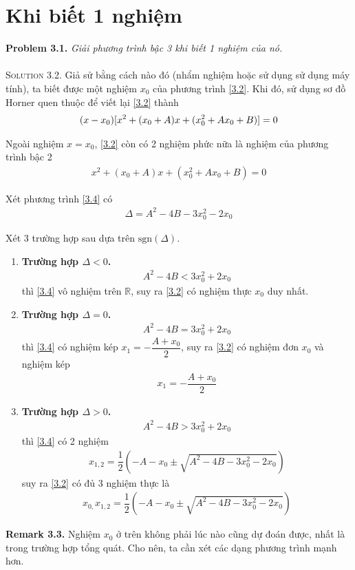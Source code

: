 \documentclass[a4paper,oneside]{book}
\numberwithin{equation}{chapter}
\begin{document}
\section{Khi biết 1 nghiệm}
\textbf{Problem 3.1.} \textit{Giải phương trình bậc 3 khi biết 1 nghiệm của nó.}\\
\\
\textsc{Solution 3.2.} Giả sử bằng cách nào đó (nhẩm nghiệm hoặc sử dụng sử dụng máy tính), ta biết được một nghiệm ${x_0}$ của phương trình \eqref{3.2}. Khi đó, sử dụng sơ đồ Horner quen thuộc để viết lại \eqref{3.2} thành
\begin{align}
(x - {x_0}){\rm{[}}{x^2} + ({x_0} + A)x + (x_0^2 + A{x_0} + B){\rm{]}} = 0
\end{align}

Ngoài nghiệm $x = {x_0}$, \eqref{3.2} còn có 2 nghiệm phức nữa là nghiệm của phương trình bậc 2
\begin{align}
\label{3.4}
{x^2} + ({x_0} + A)x + (x_0^2 + A{x_0} + B) = 0
\end{align}

Xét phương trình \eqref{3.4} có 
\begin{align}
\Delta  = {A^2} - 4B - 3x_0^2 - 2{x_0}
\end{align}

Xét 3 trường hợp sau dựa trên $\mbox{sgn} \left(\Delta \right)$.
\begin{enumerate}
\item \textbf{Trường hợp $\Delta <0$.} 
\begin{align}
{A^2} - 4B < 3x_0^2 + 2{x_0}
\end{align}
thì \eqref{3.4} vô nghiệm trên $\mathbb{R}$, suy ra \eqref{3.2} có nghiệm thực ${x_0}$ duy nhất.
\item \textbf{Trường hợp $\Delta =0$.} 
\begin{align}
{A^2} - 4B = 3x_0^2 + 2{x_0}
\end{align}
thì \eqref{3.4} có nghiệm kép ${x_1} =  - \dfrac{{A + {x_0}}}{2}$, suy ra \eqref{3.2} có nghiệm đơn ${x_0}$ và nghiệm kép 
\begin{align}
{x_1} =  - \dfrac{{A + {x_0}}}{2}
\end{align}
\item \textbf{Trường hợp $\Delta >0$.} 
\begin{align}
{A^2} - 4B > 3x_0^2 + 2{x_0}
\end{align}
thì \eqref{3.4} có 2 nghiệm 
\begin{align}
{x_{1,2}} = \dfrac{1}{2}\left( - A - {x_0} \pm \sqrt {{A^2} - 4B - 3x_0^2 - 2{x_0}}\right)
\end{align}
suy ra \eqref{3.2} có đủ 3 nghiệm thực là 
\begin{align}
\label{3.5}
{x_{0,}}{x_{1,2}} = \dfrac{1}{2}\left( - A - {x_0} \pm \sqrt {{A^2} - 4B - 3x_0^2 - 2{x_0}} \right)
\end{align}
\end{enumerate}
\textbf{Remark 3.3.} Nghiệm $x_0$ ở trên không phải lúc nào cũng dự đoán được, nhất là trong trường hợp tổng quát. Cho nên, ta cần xét các dạng phương trình mạnh hơn.\\
\end{document}
